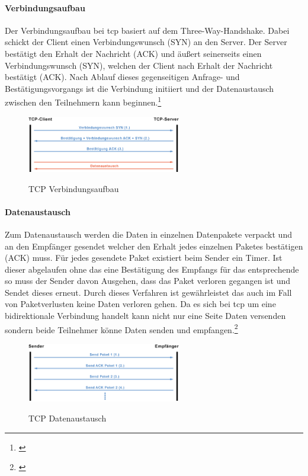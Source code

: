 \paragraph{Verbindungsaufbau}
Der Verbindungsaufbau bei \gls{tcp} basiert auf dem Three-Way-Handshake. Dabei schickt der Client einen Verbindungswunsch (SYN) an den Server. Der Server bestätigt den Erhalt der Nachricht (ACK) und äußert seinerseits einen Verbindungswunsch (SYN), welchen der Client nach Erhalt der Nachricht bestätigt (ACK). Nach Ablauf dieses gegenseitigen Anfrage- und Bestätigungsvorgangs ist die Verbindung initiiert und der Datenaustausch zwischen den Teilnehmern kann beginnen.\footnote{\citep[vgl.][TCP-Kommunikation]{Schnabel.TCPKommunikation}\label{note66}}
\begin{figure}[h]
	\centering
	\includegraphics[width=0.6\textwidth]{images/Verbindungsaufbau.png}
	\caption[TCP Verbindungsaufbau]{TCP Verbindungsaufbau}
	\cite{Schnabel.TCPKommunikation}
	\label{fig:<Sprungmakre>}
\end{figure}
\paragraph{Datenaustausch}
Zum Datenaustausch werden die Daten in einzelnen Datenpakete verpackt und an den Empfänger gesendet welcher den 
Erhalt jedes einzelnen Paketes bestätigen (ACK) muss. Für jedes gesendete Paket existiert beim Sender ein Timer. Ist dieser abgelaufen ohne das eine 
Bestätigung des Empfangs für das entsprechende so muss der Sender davon Ausgehen, dass das Paket verloren gegangen ist und Sendet dieses erneut. 
Durch dieses Verfahren ist gewährleistet das auch im Fall von Paketverlusten keine Daten verloren gehen.
Da es sich bei \gls{tcp} um eine bidirektionale Verbindung handelt kann nicht nur eine Seite Daten versenden sondern beide Teilnehmer könne Daten senden und 
empfangen.\footnote{\citep[vgl.][TCP-Kommunikation]{Schnabel.TCPKommunikation}\label{note66}}
\begin{figure}[h]
	\centering
	\includegraphics[width=0.6\textwidth]{images/Datenaustausch.png}
	\caption[TCP Datenaustausch]{TCP Datenaustausch}
	\cite{Schnabel.TCPKommunikation}
	\label{fig:<Sprungmakre>}
\end{figure}
